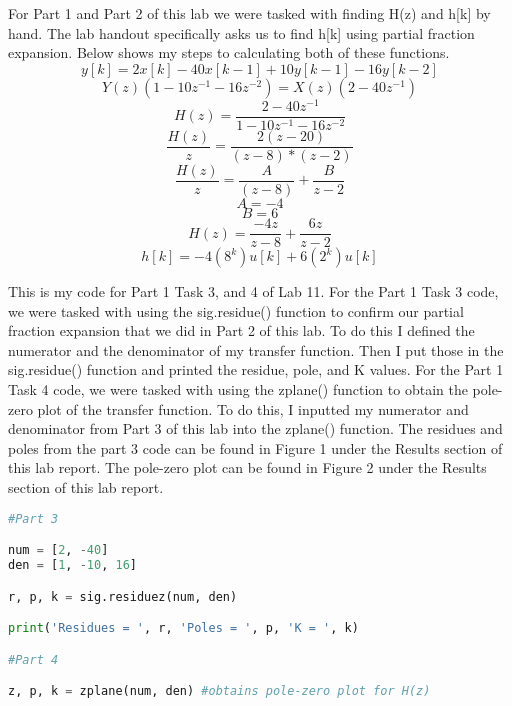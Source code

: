 \documentclass[12pt]{report}
\begin{document}
For Part 1 and Part 2 of this lab we were tasked with finding H(z) and h[k] by hand. The lab handout specifically asks us to find h[k] using partial fraction expansion. Below shows my steps to calculating both of these functions.  
\begin{equation}
    y[k] = 2x[k] − 40x[k−1] + 10y[k−1] − 16y[k−2]
\end{equation}
\begin{equation}
    Y(z)(1 - 10z^{-1} - 16z^{-2}) = X(z)(2-40z^{-1})
\end{equation}
\begin{equation}
    H(z)  = \frac{2-40z^{-1}}{1 - 10z^{-1} - 16z^{-2}}
\end{equation}
\begin{equation}
    \frac{H(z)}{z} = \frac{2(z-20)}{(z-8)*(z-2)}
\end{equation}
\begin{equation}
    \frac{H(z)}{z} = \frac{A}{(z-8)}+\frac{B}{z-2}
\end{equation}
\begin{equation}
    A = -4
\end{equation}
\begin{equation}
    B = 6
\end{equation}
\begin{equation}
    H(z)  = \frac{-4z}{z-8} + \frac{6z}{z-2}
\end{equation}
\begin{equation}
    h[k] = -4(8^{k})u[k]+6(2^{k})u[k]
\end{equation}

{This is my code for Part 1 Task 3, and 4 of Lab 11. For the Part 1 Task 3 code, we were tasked with using the sig.residue() function to confirm our partial fraction expansion that we did in Part 2 of this lab. To do this I defined the numerator and the denominator of my transfer function. Then I put those in the sig.residue() function and printed the residue, pole, and K values. For the Part 1 Task 4 code, we were tasked with using the zplane() function to obtain the pole-zero plot of the transfer function. To do this, I inputted my numerator and denominator from Part 3 of this lab into the zplane() function. The residues and poles from the part 3 code can be found in Figure 1 under the Results section of this lab report. The pole-zero plot can be found in Figure 2 under the Results section of this lab report.}
\begin{lstlisting}[language=Python]
#Part 3

num = [2, -40]
den = [1, -10, 16]

r, p, k = sig.residuez(num, den)

print('Residues = ', r, 'Poles = ', p, 'K = ', k)

#Part 4

z, p, k = zplane(num, den) #obtains pole-zero plot for H(z)
\end{lstlisting}
\end{document}
